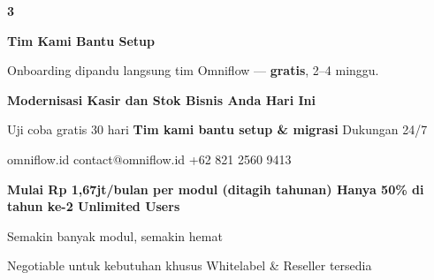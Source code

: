 \documentclass[a4paper]{article}
\begin{document}
\begin{center}
\begin{minipage}[t]{0.318\textwidth}
{\begin{minipage}[t][4.7cm][c]{\dimexpr\linewidth-2\fboxsep\relax}
            \begin{center}
                {\fontsize{22}{26}\selectfont\bfseries\color{BluePrimary} 3}
            \end{center}
            \vspace{2pt}
            \begin{center}
                {\fontsize{10}{13}\selectfont\bfseries\color{BlueDark} Tim Kami Bantu Setup}\par\vspace{3pt}
                {\fontsize{9}{12}\selectfont\color{TextDark} Onboarding dipandu langsung tim Omniflow --- \textbf{gratis}, 2--4 minggu.}
            \end{center}
        \end{minipage}}
\end{minipage}
\end{center}

\vspace{8pt}

{\setlength{\fboxsep}{10pt}\setlength{\fboxrule}{0pt}%
\noindent\colorbox{BluePrimary}{%
    \begin{minipage}{\dimexpr\textwidth-2\fboxsep\relax}
        \centering
        {\fontsize{13}{16}\selectfont\bfseries\color{White}
        Modernisasi Kasir dan Stok Bisnis Anda Hari Ini}\par\vspace{3pt}
        {\fontsize{9.5}{12}\selectfont\color{BlueMid}
        Uji coba gratis 30 hari \enspace\textbullet\enspace \textbf{Tim kami bantu setup \& migrasi} \enspace\textbullet\enspace Dukungan 24/7}\par\vspace{2pt}
        {\fontsize{9.5}{12}\selectfont\color{BlueLight}
        omniflow.id \enspace\textbullet\enspace contact@omniflow.id \enspace\textbullet\enspace +62 821 2560 9413}
    \end{minipage}}}


\vspace{6pt}

{\setlength{\fboxsep}{8pt}\setlength{\fboxrule}{0pt}%
\noindent\colorbox{BlueBg}{%
    \begin{minipage}{\dimexpr\textwidth-2\fboxsep\relax}
        \centering
        {\fontsize{9}{12}\selectfont\bfseries\color{BluePrimary}
        Mulai Rp 1,67jt/bulan per modul (ditagih tahunan) \enspace\textbullet\enspace Hanya 50\% di tahun ke-2 \enspace\textbullet\enspace Unlimited Users}\par\vspace{1pt}
        {\fontsize{8.5}{11}\selectfont\color{BlueDark}
        Semakin banyak modul, semakin hemat}\par\vspace{1pt}
        {\fontsize{8}{10}\selectfont\color{TextLight}
        Negotiable untuk kebutuhan khusus \enspace\textbullet\enspace Whitelabel \& Reseller tersedia}
    \end{minipage}}}

\restoregeometry
\pagestyle{empty}
\end{document}
